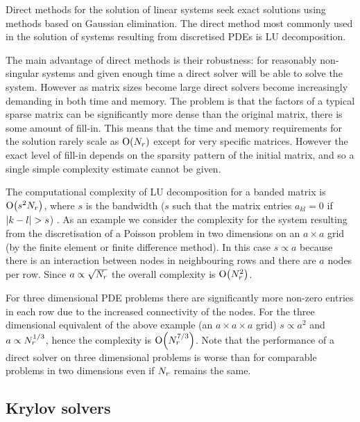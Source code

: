 Direct methods for the solution of linear systems seek exact solutions using methods based on Gaussian elimination.
The direct method most commonly used in the solution of systems resulting from discretised PDEs is LU decomposition.

The main advantage of direct methods is their robustness: for reasonably non-singular systems and given enough time a direct solver will be able to solve the system.
However as matrix sizes become large direct solvers become increasingly demanding in both time and memory.
The problem is that the factors of a typical sparse matrix can be significantly more dense than the original matrix, \ie there is some amount of fill-in.
This means that the time and memory requirements for the solution rarely scale as $\mathrm{O}{\left( N_r \right)}$ except for very specific matrices.
However the exact level of fill-in depends on the sparsity pattern of the initial matrix, and so a single simple complexity estimate cannot be given.

The computational complexity of LU decomposition for a banded matrix is $\mathrm{O}{\left( s^2 N_r \right)}$, where $s$ is the bandwidth (\ie $s$ such that the matrix entries $a_{kl} = 0$ if $\left|{k - l} \right| > s$) \cite[236]{Iserles2009}.
As an example we consider the complexity for the system resulting from the discretisation of a Poisson problem in two dimensions on an $a \times a$ grid (by the finite element or finite difference method).
In this case $s \propto a$ because there is an interaction between nodes in neighbouring rows and there are $a$ nodes per row.
Since $a \propto \sqrt{N_r}$ the overall complexity is $\mathrm{O}{\left( N_r^2 \right)}$.

For three dimensional PDE problems there are significantly more non-zero entries in each row due to the increased connectivity of the nodes.
For the three dimensional equivalent of the above example (an $a \times a \times a$ grid) $s \propto a^2$ and $a \propto N_r^{1/3}$, hence the complexity is $\mathrm{O}{\left( N_r^{7/3} \right)}$.
Note that the performance of a direct solver on three dimensional problems is worse than for comparable problems in two dimensions even if $N_r$ remains the same.


\subsection{Krylov solvers}
\label{sec:krylov-solvers}

